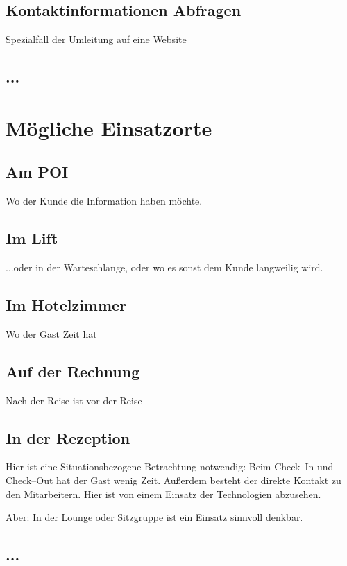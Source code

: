 \subsection{Kontaktinformationen Abfragen}
Spezialfall der Umleitung auf eine Website

\subsection{...}

\section{Mögliche Einsatzorte}
\label{sec:einsatzorte}

\subsection{Am POI}
Wo der Kunde die Information haben möchte.

\subsection{Im Lift}
...oder in der Warteschlange, oder wo es sonst dem Kunde langweilig wird.

\subsection{Im Hotelzimmer}
Wo der Gast Zeit hat

\subsection{Auf der Rechnung}
Nach der Reise ist vor der Reise

\subsection{In der Rezeption}

Hier ist eine Situationsbezogene Betrachtung notwendig: Beim Check--In und Check--Out hat der Gast wenig Zeit. Außerdem besteht der direkte Kontakt zu den Mitarbeitern. Hier ist von einem Einsatz der Technologien abzusehen.

Aber: In der Lounge oder Sitzgruppe ist ein Einsatz sinnvoll denkbar.

\subsection{...}

